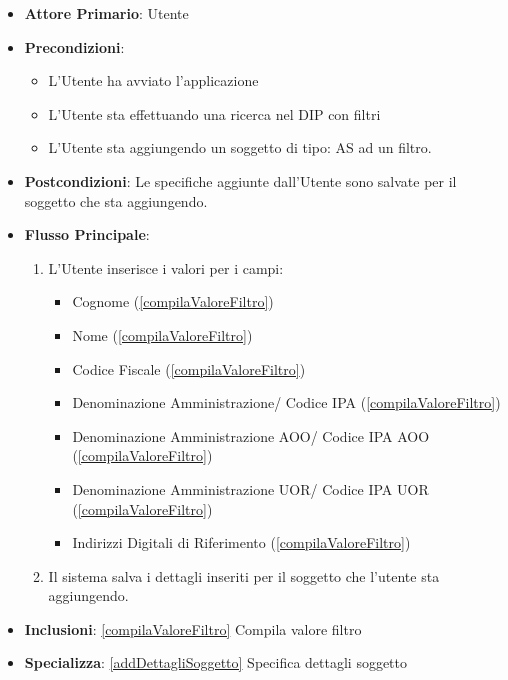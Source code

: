 \begin{itemize}
      \item \textbf{Attore Primario}: Utente
      \item \textbf{Precondizioni}:\begin{itemize}
            \item L'Utente ha avviato l'applicazione
            \item L'Utente sta effettuando una ricerca nel DIP con filtri
            \item L'Utente sta aggiungendo un soggetto di tipo: AS ad un filtro.
            \end{itemize}
      \item \textbf{Postcondizioni}:  Le specifiche aggiunte dall'Utente sono salvate per il soggetto che sta aggiungendo.
      \item \textbf{Flusso Principale}:
            \begin{enumerate}
                  \item L'Utente inserisce i valori per i campi:
                        \begin{itemize}
                              \item Cognome (\ref{compilaValoreFiltro})
                              \item Nome (\ref{compilaValoreFiltro})
                              \item Codice Fiscale (\ref{compilaValoreFiltro})
                              \item Denominazione Amministrazione/ Codice IPA (\ref{compilaValoreFiltro})
                              \item Denominazione Amministrazione AOO/ Codice IPA AOO (\ref{compilaValoreFiltro})
                              \item Denominazione Amministrazione UOR/ Codice IPA UOR (\ref{compilaValoreFiltro})
                              \item Indirizzi Digitali di Riferimento (\ref{compilaValoreFiltro})
                        \end{itemize}
                  \item Il sistema salva i dettagli inseriti per il soggetto che l'utente sta aggiungendo.
            \end{enumerate}
      \item \textbf{Inclusioni}: \ref{compilaValoreFiltro} Compila valore filtro
      \item \textbf{Specializza}: \ref{addDettagliSoggetto} Specifica dettagli soggetto
\end{itemize}

